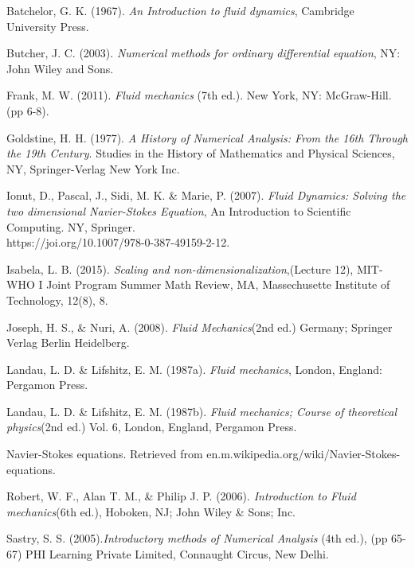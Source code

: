 \documentclass[11pt]{report}
\begin{document}
	\begin{description}
		\item Batchelor, G. K. (1967). \emph{An Introduction to fluid dynamics}, Cambridge University Press.
		
		\item Butcher, J. C. (2003). \emph{Numerical methods for ordinary differential equation}, NY: John Wiley and Sons.
		
		\item Frank, M. W. (2011). \emph{Fluid mechanics} (7th ed.). New York, NY: McGraw-Hill. (pp 6-8).
		
		\item Goldstine, H. H. (1977). \emph{A History of Numerical Analysis: From the 16th Through the 19th Century}. Studies in the History of Mathematics and Physical Sciences, NY, Springer-Verlag New York Inc.
		
		\item Ionut, D., Pascal, J., Sidi, M. K. \& Marie, P. (2007). \emph{Fluid Dynamics: Solving the two dimensional Navier-Stokes Equation}, An Introduction to Scientific Computing. NY, Springer.\\
		https://joi.org/10.1007/978-0-387-49159-2-12.
		
		\item Isabela, L. B. (2015). \emph{Scaling and non-dimensionalization},(Lecture 12), MIT-WHO I Joint Program Summer Math Review, MA, Massechusette Institute of Technology, 12(8), 8.
		
		\item Joseph, H. S., \& Nuri, A. (2008). \emph{Fluid Mechanics}(2nd ed.) Germany; Springer Verlag Berlin Heidelberg.
		
		\item Landau, L. D. \& Lifshitz, E. M. (1987a). \emph{Fluid mechanics}, London, England: Pergamon Press.
		
		\item  Landau, L. D. \& Lifshitz, E. M. (1987b). \emph{Fluid mechanics; Course of theoretical physics}(2nd ed.) Vol. 6, London, England, Pergamon Press.
		
		\item Navier-Stokes equations. Retrieved from en.m.wikipedia.org/wiki/Navier-Stokes-equations.
		
		\item Robert, W. F., Alan T. M., \& Philip J. P. (2006). \emph{Introduction to Fluid mechanics}(6th ed.), Hoboken, NJ; John Wiley \& Sons; Inc.
		
		\item Sastry, S. S. (2005).\emph{Introductory methods of Numerical Analysis} (4th ed.), (pp 65-67) PHI Learning Private Limited, Connaught Circus, New Delhi.
		

\end{description}
\end{document}
